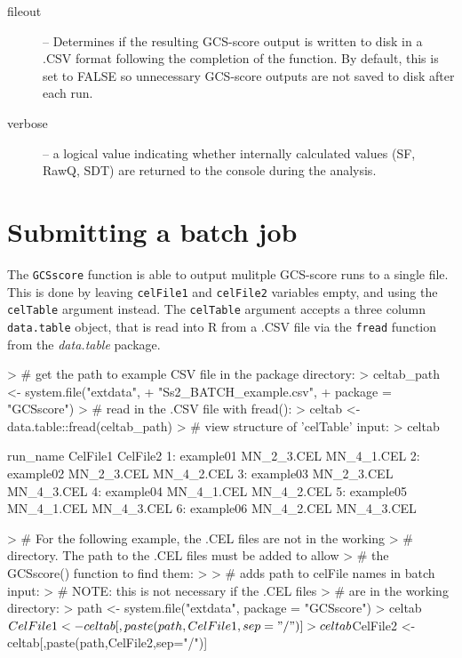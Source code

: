 \documentclass[12pt]{article}
\newcommand{\Rfunction}[1]{{\texttt{#1}}}
\newcommand{\Robject}[1]{{\texttt{#1}}}
\newcommand{\Rpackage}[1]{{\textit{#1}}}
\begin{document}
\begin{description}
\item[fileout] -- Determines if the resulting GCS-score output is written to disk in a .CSV format following the completion of the function. By default, this is set to FALSE so unnecessary GCS-score outputs are not saved to disk after each run.
\item[verbose] -- a logical value indicating whether internally calculated values (SF, RawQ, SDT) are returned to the console during the analysis.
\end{description}

\section{Submitting a batch job}
The \Rfunction{GCSscore} function is able to output mulitple GCS-score runs to a single file.  This is done by leaving \Robject{celFile1} and \Robject{celFile2} variables empty, and using the \Robject{celTable} argument instead.  The \Robject{celTable} argument accepts a three column \Robject{data.table} object, that is read into R from a .CSV file via the \Rfunction{fread} function from the \Rpackage{data.table} package.
\begin{Schunk}
\begin{Sinput}
> # get the path to example CSV file in the package directory:
> celtab_path <- system.file("extdata",
+                            "Ss2_BATCH_example.csv", 
+                            package = "GCSscore")
> # read in the .CSV file with fread():
> celtab <- data.table::fread(celtab_path)
> # view structure of 'celTable' input:
> celtab
\end{Sinput}
\begin{Soutput}
    run_name   CelFile1   CelFile2
1: example01 MN_2_3.CEL MN_4_1.CEL
2: example02 MN_2_3.CEL MN_4_2.CEL
3: example03 MN_2_3.CEL MN_4_3.CEL
4: example04 MN_4_1.CEL MN_4_2.CEL
5: example05 MN_4_1.CEL MN_4_3.CEL
6: example06 MN_4_2.CEL MN_4_3.CEL
\end{Soutput}
\end{Schunk}

\begin{Schunk}
\begin{Sinput}
> # For the following example, the .CEL files are not in the working
> # directory.  The path to the .CEL files must be added to allow
> # the GCSscore() function to find them:
> 
> # adds path to celFile names in batch input:
> #   NOTE: this is not necessary if the .CEL files 
> #         are in the working directory:
> path <- system.file("extdata", package = "GCSscore")
> celtab$CelFile1 <- celtab[,paste(path,CelFile1,sep="/")]
> celtab$CelFile2 <- celtab[,paste(path,CelFile2,sep="/")]
\end{Sinput}
\end{Schunk}
\end{document}
